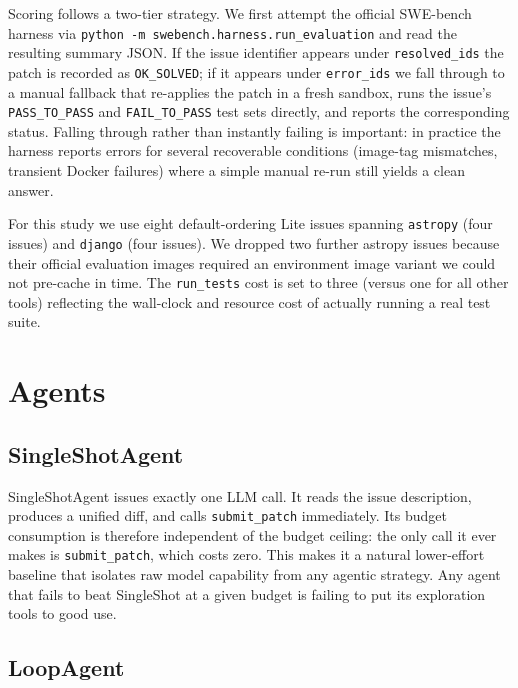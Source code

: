 \documentclass[11pt]{article}
\begin{document}
Scoring follows a two-tier strategy. We first attempt the official
SWE-bench harness via \texttt{python -m swebench.harness.run\_evaluation}
and read the resulting summary JSON. If the issue identifier appears
under \texttt{resolved\_ids} the patch is recorded as
\texttt{OK\_SOLVED}; if it appears under \texttt{error\_ids} we fall
through to a manual fallback that re-applies the patch in a fresh
sandbox, runs the issue's \texttt{PASS\_TO\_PASS} and
\texttt{FAIL\_TO\_PASS} test sets directly, and reports the corresponding
status. Falling through rather than instantly failing is important: in
practice the harness reports errors for several recoverable conditions
(image-tag mismatches, transient Docker failures) where a simple manual
re-run still yields a clean answer.

For this study we use eight default-ordering Lite issues spanning
\texttt{astropy} (four issues) and \texttt{django} (four issues). We dropped two
further astropy issues because their official evaluation images
required an environment image variant we could not pre-cache in time. The \texttt{run\_tests} cost is set to three (versus one for all
other tools) reflecting the wall-clock and resource cost of actually
running a real test suite.

\section{Agents}
\label{sec:agents}

\subsection{SingleShotAgent}
\label{sec:agents:singleshot}

SingleShotAgent issues exactly one LLM call. It reads the issue
description, produces a unified diff, and calls \texttt{submit\_patch}
immediately. Its budget consumption is therefore independent of the
budget ceiling: the only call it ever makes is \texttt{submit\_patch},
which costs zero. This makes it a natural lower-effort baseline that
isolates raw model capability from any agentic strategy. Any agent that
fails to beat SingleShot at a given budget is failing to put its
exploration tools to good use.

\subsection{LoopAgent}
\label{sec:agents:loop}
\end{document}
